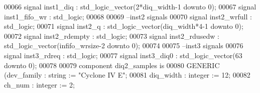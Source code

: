 \begin{DoxyCode}
00066 \textcolor{keywordflow}{signal} \textcolor{vhdlchar}{inst1_diq}                \textcolor{vhdlchar}{:} \textcolor{comment}{std\_logic\_vector}\textcolor{vhdlchar}{(}\textcolor{vhdllogic}{}\textcolor{vhdllogic}{2}\textcolor{vhdlchar}{*}\textcolor{vhdlchar}{diq_width}\textcolor{vhdlchar}{-}\textcolor{vhdllogic}{}\textcolor{vhdllogic}{1} \textcolor{keywordflow}{downto} \textcolor{vhdllogic}{}\textcolor{vhdllogic}{0}\textcolor{vhdlchar}{)};
00067 \textcolor{keywordflow}{signal} \textcolor{vhdlchar}{inst1_fifo_wr}            \textcolor{vhdlchar}{:} \textcolor{comment}{std\_logic};
00068 
00069 \textcolor{keyword}{--inst2 signals}
00070 \textcolor{keywordflow}{signal} \textcolor{vhdlchar}{inst2_wrfull}             \textcolor{vhdlchar}{:} \textcolor{comment}{std\_logic};
00071 \textcolor{keywordflow}{signal} \textcolor{vhdlchar}{inst2_q}                  \textcolor{vhdlchar}{:} \textcolor{comment}{std\_logic\_vector}\textcolor{vhdlchar}{(}\textcolor{vhdlchar}{diq_width}\textcolor{vhdlchar}{*}\textcolor{vhdllogic}{4-1} \textcolor{keywordflow}{downto} \textcolor{vhdllogic}{}\textcolor{vhdllogic}{0}\textcolor{vhdlchar}{)};
00072 \textcolor{keywordflow}{signal} \textcolor{vhdlchar}{inst2_rdempty}            \textcolor{vhdlchar}{:} \textcolor{comment}{std\_logic};
00073 \textcolor{keywordflow}{signal} \textcolor{vhdlchar}{inst2_rdusedw}            \textcolor{vhdlchar}{:} \textcolor{comment}{std\_logic\_vector}\textcolor{vhdlchar}{(}\textcolor{vhdlchar}{infifo_wrsize}\textcolor{vhdlchar}{-}\textcolor{vhdllogic}{}\textcolor{vhdllogic}{2} \textcolor{keywordflow}{downto} \textcolor{vhdllogic}{}\textcolor{vhdllogic}{0}\textcolor{vhdlchar}{)};
00074 
00075 \textcolor{keyword}{--inst3 signals }
00076 \textcolor{keywordflow}{signal} \textcolor{vhdlchar}{inst3_rdreq}          \textcolor{vhdlchar}{:} \textcolor{comment}{std\_logic};
00077 \textcolor{keywordflow}{signal} \textcolor{vhdlchar}{inst3_diq0}               \textcolor{vhdlchar}{:} \textcolor{comment}{std\_logic\_vector}\textcolor{vhdlchar}{(}\textcolor{vhdllogic}{}\textcolor{vhdllogic}{63} \textcolor{keywordflow}{downto} \textcolor{vhdllogic}{}\textcolor{vhdllogic}{0}\textcolor{vhdlchar}{)};
00078 
00079 \textcolor{keywordflow}{component} diq2_samples \textcolor{keywordflow}{is}
00080     \textcolor{keywordflow}{GENERIC} (dev_family     : \textcolor{comment}{string}        := \textcolor{keyword}{"Cyclone IV E"};
00081                 diq_width       : \textcolor{comment}{integer}   := \textcolor{vhdllogic}{}\textcolor{vhdllogic}{12};
00082                 ch_num          : \textcolor{comment}{integer}   := \textcolor{vhdllogic}{}\textcolor{vhdllogic}{2};

\end{DoxyCode}
